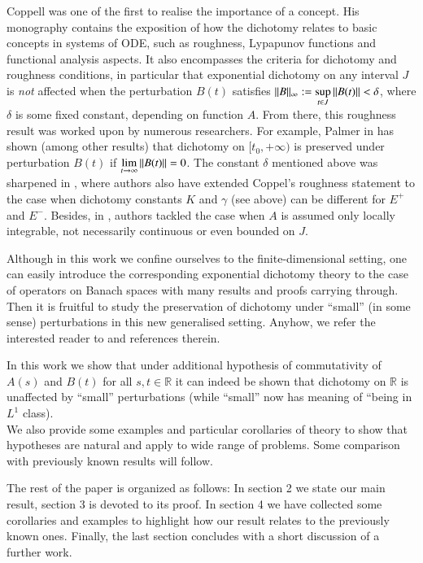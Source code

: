 \documentclass{elsarticle}
\theoremstyle{remark}
\begin{document}
Coppell was one of the first to realise the importance of a concept. His monography
 \cite{coppel1978dichotomies} contains the exposition of how the dichotomy relates to basic concepts in systems of ODE, such as
roughness, Lypapunov functions and functional analysis aspects. It also encompasses the criteria for dichotomy and roughness
conditions, in particular that exponential dichotomy on any interval $J$ is \textit{not} affected when the perturbation $B(t)$
satisfies $\mynorm{B}_\infty:=\sup_{t\in J}\mynorm{B(t)}<\delta$, where $\delta$ is some fixed constant, depending on function $A$.
From there, this roughness result was worked upon by numerous researchers. For example, Palmer in
\cite{palmer1984exponential} has shown (among other results) that dichotomy on $[t_0,+\infty)$ is preserved under perturbation
$B(t)$ if $\lim_{t\to\infty}\mynorm{B(t)}=0$. The constant $\delta$ mentioned above was sharpened in
\cite{Naulin1998559}, where authors also have extended Coppel's roughness statement to the case when dichotomy constants
$K$ and $\gamma$ (see above) can be different for $E^+$ and $E^-$. Besides, in \cite{Ju200139}, authors tackled the case when
$A$ is assumed only locally integrable, not necessarily continuous or even bounded on $J$.

Although in this work we confine ourselves to the finite-dimensional setting, one can easily introduce the corresponding
exponential dichotomy theory to the case of operators on Banach spaces with many results and proofs carrying through. Then it
is fruitful to study the preservation of dichotomy under ``small'' (in some sense) perturbations in this new generalised setting.
Anyhow, we refer the interested reader to \cite{Popescu2006436} and references therein.

In this work we show that under additional hypothesis of commutativity of $A(s)$ and $B(t)$ for all $s,t\in\mathbb{R}$
it can indeed be shown that dichotomy on $\mathbb{R}$ is unaffected by ``small'' perturbations (while ``small'' now
has meaning of ``being in $L^1$ class).\\
We also provide some examples and particular corollaries of theory to show that hypotheses are natural and apply to wide
range of problems. Some comparison with previously known results will follow.

The rest of the paper is organized as follows: In section 2 we state our main result, section 3 is devoted to its proof.
In section 4 we have collected some corollaries and examples to highlight how our result relates to the previously known ones.
Finally, the last section concludes with a short discussion of a further work.
\end{document}
